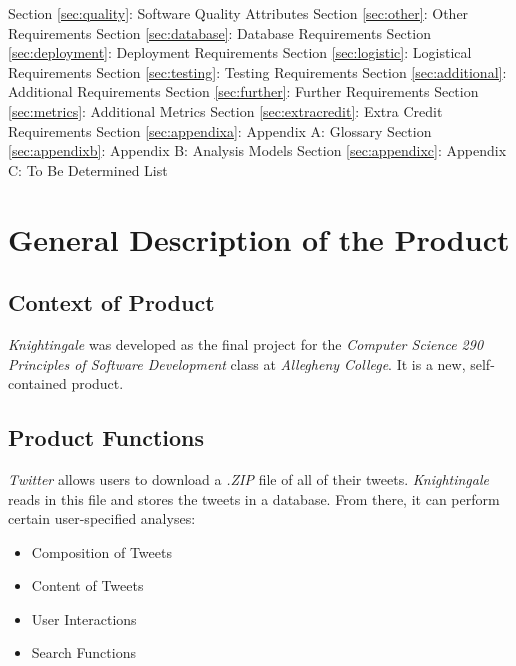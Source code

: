 \documentclass[a4paper, 12pt]{article}
\begin{document}
\begin{adjustwidth}{2em}{0pt}
Section \ref{sec:quality}: Software Quality Attributes \newline
Section \ref{sec:other}: Other Requirements \newline
Section \ref{sec:database}: Database Requirements \newline
Section \ref{sec:deployment}: Deployment Requirements \newline
Section \ref{sec:logistic}: Logistical Requirements \newline
Section \ref{sec:testing}: Testing Requirements \newline
Section \ref{sec:additional}: Additional Requirements \newline
Section \ref{sec:further}: Further Requirements \newline
Section \ref{sec:metrics}: Additional Metrics \newline
Section \ref{sec:extracredit}: Extra Credit Requirements \newline
Section \ref{sec:appendixa}: Appendix A: Glossary \newline
Section \ref{sec:appendixb}: Appendix B: Analysis Models \newline
Section \ref{sec:appendixc}: Appendix C: To Be Determined List \newline
\end{adjustwidth}

\section{General Description of the Product} \label{sec:general}
\subsection{Context of Product} \label{sec:context}
\begin{adjustwidth}{2em}{0pt}
\textit{Knightingale} was developed as the final project for the \textit{Computer Science 290 Principles of Software Development} class at \textit{Allegheny College}. It is a new, self-contained product. 
\end{adjustwidth}
 
\subsection{Product Functions} \label{sec:functions}
\begin{adjustwidth}{2em}{0pt}
\textit{Twitter} allows users to download a \textit{.ZIP} file of all of their tweets. \textit{Knightingale} reads in this file and stores the tweets in a database. From there, it can perform certain user-specified analyses:
\begin{itemize}
\item Composition of Tweets
\item Content of Tweets
\item User Interactions
\item Search Functions
\end{itemize}
\end{adjustwidth}
\end{document}
